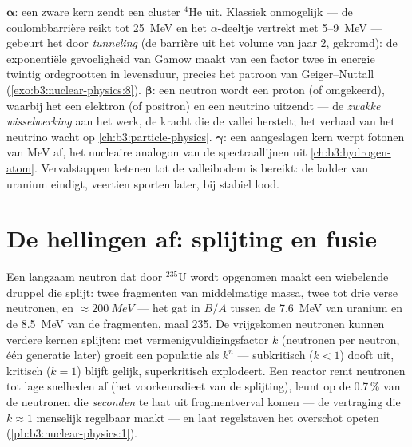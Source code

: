 \begin{remark}\label{rem:b3:nuclear-physics:modes}
$\boldsymbol\alpha$: een zware kern zendt een cluster $^4$He uit. Klassiek
onmogelijk --- de coulombbarrière reikt tot \qty{25}{MeV} en het
$\alpha$-deeltje vertrekt met \qty{5}{}--\qty{9}{MeV} --- gebeurt het door
\emph{tunneling} (de barrière uit het volume van jaar 2, gekromd): de
exponentiële gevoeligheid van Gamow maakt van een factor twee in energie twintig
ordegrootten in levensduur, precies het patroon van Geiger--Nuttall
(\cref{exo:b3:nuclear-physics:8}).
$\boldsymbol\beta$: een neutron wordt een proton (of omgekeerd), waarbij het
een elektron (of positron) en een neutrino uitzendt --- de \emph{zwakke
wisselwerking} aan het werk, de kracht die de vallei herstelt; het verhaal van het
neutrino wacht op \cref{ch:b3:particle-physics}.
$\boldsymbol\gamma$: een aangeslagen kern werpt fotonen van \unit{MeV} af, het
nucleaire analogon van de spectraallijnen uit \cref{ch:b3:hydrogen-atom}.
Vervalstappen ketenen tot de valleibodem is bereikt: de ladder van uranium
eindigt, veertien sporten later, bij stabiel lood.
\end{remark}

\section{De hellingen af: splijting en fusie}

\begin{proposition}\label{prop:b3:nuclear-physics:fission}
Een langzaam neutron dat door $^{235}$U wordt opgenomen maakt een wiebelende druppel die
splijt: twee fragmenten van middelmatige massa, twee tot drie verse neutronen, en
$\approx\qty{200}{MeV}$ --- het gat in $B/A$ tussen de
\qty{7.6}{MeV} van uranium en de \qty{8.5}{MeV} van de fragmenten, maal 235.
De vrijgekomen neutronen kunnen verdere kernen splijten: met
vermenigvuldigingsfactor $k$ (neutronen per neutron, één generatie
later) groeit een populatie als $k^n$ --- subkritisch ($k < 1$)
dooft uit, kritisch ($k = 1$) blijft gelijk, superkritisch explodeert.
Een reactor remt neutronen tot lage snelheden af (het voorkeursdieet van de splijting),
leunt op de 0.7\,\% van de neutronen die \emph{seconden}
te laat uit fragmentverval komen --- de vertraging die
$k \approx 1$ menselijk regelbaar maakt --- en laat regelstaven het
overschot opeten (\cref{pb:b3:nuclear-physics:1}).
\end{proposition}
\admitted

